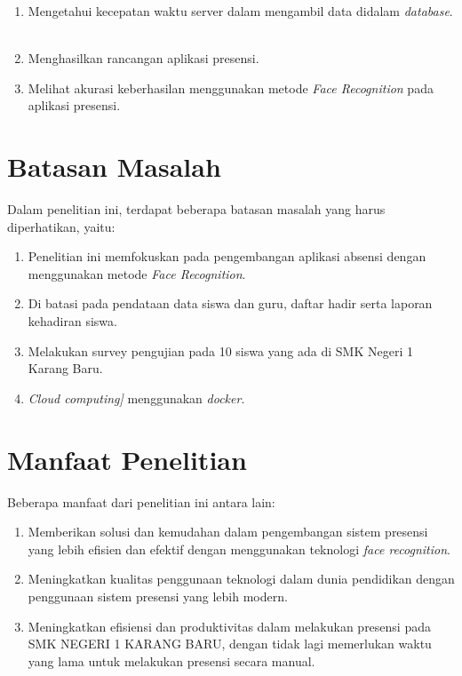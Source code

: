 \begin{enumerate}
\item Mengetahui kecepatan waktu server dalam mengambil data didalam \emph{database}. \
\item Menghasilkan rancangan aplikasi presensi. \
\item Melihat akurasi keberhasilan menggunakan metode \emph{Face Recognition} pada aplikasi presensi.\
\end{enumerate}


\section{Batasan Masalah}
Dalam penelitian ini, terdapat beberapa batasan masalah yang harus diperhatikan, yaitu:
\begin{enumerate}
\item Penelitian ini memfokuskan pada pengembangan aplikasi absensi dengan menggunakan metode \emph{Face Recognition}.
\item Di batasi pada pendataan data siswa dan guru, daftar hadir serta laporan kehadiran siswa.
\item Melakukan survey pengujian pada 10 siswa yang ada di SMK Negeri 1 Karang Baru.
\item \emph{Cloud computing]} menggunakan \emph{docker}.
\end{enumerate}

\section{Manfaat Penelitian}
Beberapa manfaat dari penelitian ini antara lain:

\begin{enumerate}
\item Memberikan solusi dan kemudahan dalam pengembangan sistem presensi yang lebih efisien dan efektif dengan menggunakan teknologi \emph{face recognition}.
\item Meningkatkan kualitas penggunaan teknologi dalam dunia pendidikan dengan penggunaan sistem presensi yang lebih modern.
\item Meningkatkan efisiensi dan produktivitas dalam melakukan presensi pada SMK NEGERI 1 KARANG BARU, dengan tidak lagi memerlukan waktu yang lama untuk melakukan presensi secara manual.
\end{enumerate}